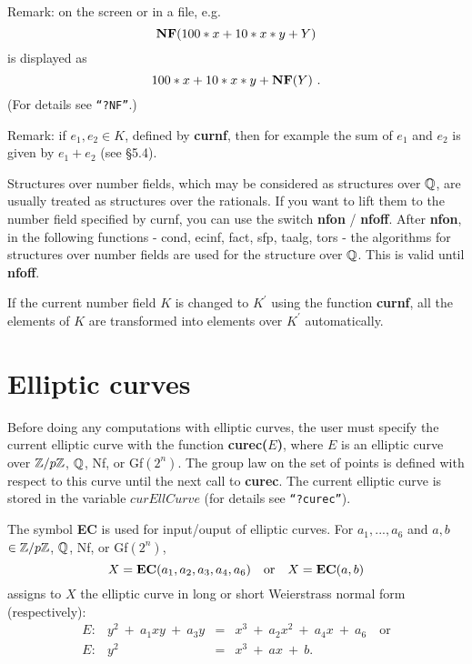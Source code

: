 Remark: on the screen or in a file, e.g.
$$
\mbox{\bf NF}(100*x+10*x*y+Y)
$$
is displayed as
$$
100 * x + 10 * x * y + {\bf NF}(Y)\ .
$$
(For details see {\tt ``?NF''}.)

Remark: if $e_1,e_2 \in K$, defined by {\bf curnf}, then for example the sum of $e_1$ and $e_2$
is given by $e_1 + e_2$ (see \S 5.4).

Structures over number fields, which may be considered as structures over $\mbox{$\mathbb Q$}$,
are usually treated as structures over the rationals. If you want to lift them
to the number field specified by curnf, you can use the switch 
{\bf nfon} / {\bf nfoff}. After {\bf nfon}, in the following functions - cond, 
ecinf, fact, sfp, taalg, tors - the algorithms for structures over number 
fields are used for the structure over $\mbox{$\mathbb Q$}$. This is valid until {\bf nfoff}.

If the current number field $K$ is changed to $K^{\prime }$ using the function 
{\bf curnf}, all the elements of $K$ are transformed into elements over 
$K^{\prime }$ automatically.


\section{Elliptic curves}
Before doing any computations with elliptic curves, the user must specify
the current elliptic curve with the function {\bf curec($E$)}, where $E$ is
an elliptic curve over $\mbox{$\mathbb Z$}/p\mbox{$\mathbb Z$}$, $\mbox{$\mathbb Q$}$, Nf, or Gf$(2^n)$. The group law on the
set of points is defined with respect to this curve until the next call to
{\bf curec}. The current elliptic curve is stored in the variable $curEllCurve$
(for details see {\tt ``?curec''}).

The symbol {\bf EC} is used for input/ouput of elliptic curves. For $a_1, ... ,a_6$
and $a,b$ $\in \mbox{$\mathbb Z$}/p\mbox{$\mathbb Z$}$, $\mbox{$\mathbb Q$}$, Nf, or Gf$(2^n)$,
$$
X = \mbox{\bf EC}(a_1, a_2, a_3, a_4, a_6)\quad \mbox{or}\quad
X = \mbox{\bf EC}(a, b)
$$
assigns to $X$ the elliptic curve in long or short Weierstrass normal form (respectively):
$$\begin{array}{rrcl}
E: &y^2\ +\ a_1xy\ +\ a_3y &= &x^3\ +\ a_2x^2\ +\ a_4x\ +\ a_6\quad \mbox{or}\\
E: &y^2 &= &x^3\ +\ ax\ +\ b.
\end{array}$$

